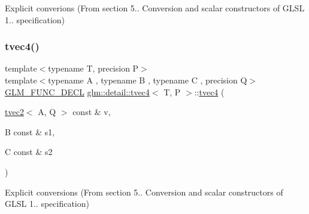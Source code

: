 Explicit converions (From section 5.. Conversion and scalar constructors of G\+L\+SL 1.. specification) 

\mbox{\label{structglm_1_1detail_1_1tvec4_a5fa780e942ec21ec77ec2fe9d8f57cf3}} 
\subsubsection{\texorpdfstring{tvec4()}{tvec4()}\hspace{0.1cm}{\footnotesize\ttfamily [8/23]}}
{\footnotesize\ttfamily template$<$typename T, precision P$>$ \\
template$<$typename A , typename B , typename C , precision Q$>$ \\
\hyperlink{setup_8hpp_ab2d052de21a70539923e9bcbf6e83a51}{G\+L\+M\+\_\+\+F\+U\+N\+C\+\_\+\+D\+E\+CL} \hyperlink{structglm_1_1detail_1_1tvec4}{glm\+::detail\+::tvec4}$<$ T, P $>$\+::\hyperlink{structglm_1_1detail_1_1tvec4}{tvec4} (\begin{DoxyParamCaption}\item[{\hyperlink{structglm_1_1detail_1_1tvec2}{tvec2}$<$ A, Q $>$ const \&}]{v,  }\item[{B const \&}]{s1,  }\item[{C const \&}]{s2 }\end{DoxyParamCaption})\hspace{0.3cm}{\ttfamily [explicit]}}



Explicit conversions (From section 5.. Conversion and scalar constructors of G\+L\+SL 1.. specification) 

\mbox{\label{structglm_1_1detail_1_1tvec4_ad3de2f66c42e8d6c46d9f85abef13ea2}} 
